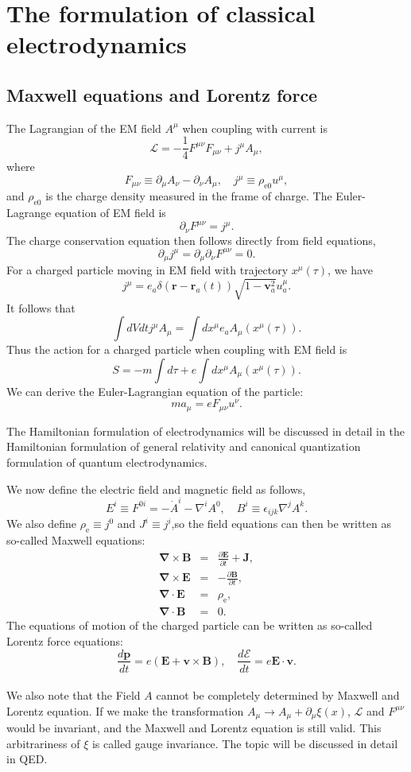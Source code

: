 \section{The formulation of classical electrodynamics}
\subsection{Maxwell equations and Lorentz force}
The Lagrangian of the EM field $A^{\mu}$ when coupling with current is
\[\mathcal{L} = -\frac{1}{4}F^{\mu\nu}F_{\mu\nu} + j^{\mu} A_{\mu},\]
where
\[F_{\mu\nu} \equiv \partial_{\mu}A_{\nu} - \partial_{\nu}A_{\mu} , \quad j^{\mu} \equiv \rho_{\mathrm{e}0} u^{\mu},\]
and $\rho_{\mathrm{e}0}$ is the charge density measured in the frame of charge.
The Euler-Lagrange equation of EM field is
\[\partial_{\nu} F^{\mu\nu} = j^{\mu}.\]
The charge conservation equation then follows directly from field equations,
\[\partial_{\mu} j^{\mu} = \partial_{\mu} \partial_{\nu} F^{\mu\nu} = 0.\]
For a charged particle moving in EM field with trajectory $x^{\mu}(\tau)$, we have
\[j^{\mu} =  e_a \delta(\bm{r}-\bm{r}_a(t)) \sqrt{1-\bm{v}_a^2} u_a^\mu .\]
It follows that
\[\int dV dt j^{\mu} A_{\mu} = \int dx^{\mu} e_a A_{\mu}(x^{\mu}(\tau)).\]
Thus the action for a charged particle when coupling with EM field is
\[S = - m \int d\tau + e\int dx^{\mu} A_{\mu}(x^{\mu}(\tau)).\]
We can derive the Euler-Lagrangian equation of the particle:
\[ma_{\mu} = eF_{\mu \nu}u^{\nu}.\]
\begin{note}
The Hamiltonian formulation of electrodynamics will be discussed in detail in the Hamiltonian formulation of general relativity and canonical quantization formulation of quantum electrodynamics.
\end{note}
\noindent
We now define the electric field and magnetic field as follows,
\[E^i \equiv F^{0i} = -\dot{A}^i - \nabla^i A^0 , \quad B^i \equiv \epsilon_{ijk} \nabla^j A^k.\]
We also define $\rho_{\mathrm{e}} \equiv j^0$ and $J^i \equiv j^i$,so
the field equations can then be written as so-called Maxwell equations:
\begin{eqnarray}
	\bm{\nabla} \times  \bm{B} &=& \frac{\partial \bm{E}}{\partial t} +  \bm{J} ,\nonumber \\
	\bm{\nabla} \times \bm{E} &=& -\frac{\partial \bm{B}}{\partial t} ,\nonumber \\
	\bm{\nabla} \cdot \bm{E} &=& \rho_{\mathrm{e}}, \nonumber \\
	\bm{\nabla} \cdot \bm{B} &=& 0 .\nonumber
\end{eqnarray}
The equations of motion of the charged particle can be written as so-called Lorentz force equations:
\[\frac{d\bm{p}}{dt} = e(\bm{E} + \bm{v} \times \bm{B}) , \quad \frac{d \mathcal{E}}{dt} = e \bm{E} \cdot \bm{v}.\]
\\
We also note that the Field $A$ cannot be completely determined by Maxwell and Lorentz equation. If we make the transformation $A_{\mu} \to A_{\mu} + \partial_{\mu} \xi(x)$, $\mathcal{L}$ and $F^{\mu\nu}$ would be invariant, and the Maxwell and Lorentz equation is still valid. This arbitrariness of $\xi$ is called gauge invariance. The topic will be discussed in detail in QED.

